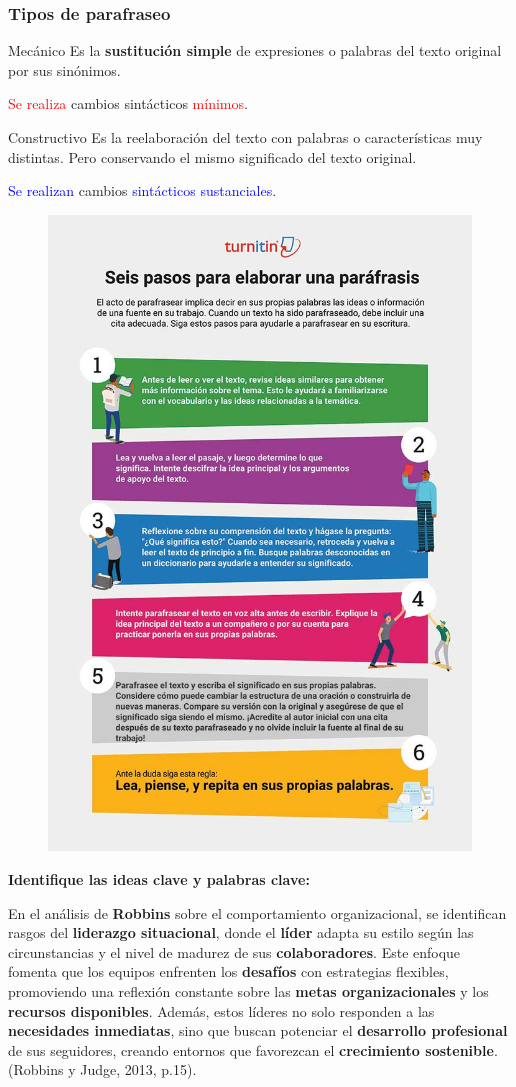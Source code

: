 \documentclass[
11pt, %
]{beamer}
\begin{document}
\begin{frame}
	\frametitle{Tipos de parafraseo}
	\begin{block}{Mecánico}
		Es la \textbf{sustitución simple} de expresiones o palabras del texto original por sus sinónimos.

		\textcolor{red}{Se realiza} cambios sintácticos \textcolor{red}{mínimos}.
	\end{block}

	\begin{block}{Constructivo}
		Es la reelaboración del texto con palabras o características muy distintas. Pero conservando el mismo significado del texto original.

		\textcolor{blue}{Se realizan} cambios \textcolor{blue}{sintácticos} \textcolor{blue}{sustanciales}.
	\end{block}
\end{frame}

\begin{frame}
	\begin{figure}[H]
		\centering
		\includegraphics[width=0.5\linewidth]{images/seis-pasos-para-elaborar-una-parafrasis-opt}
	\end{figure}
\end{frame}

\begin{frame}
	\textbf{Identifique las ideas clave y palabras clave:}
	\begin{block}{} %
		En el análisis de \textbf{Robbins} sobre el comportamiento organizacional, se identifican rasgos del \textbf{liderazgo situacional}, donde el \textbf{líder} adapta su estilo según las circunstancias y el nivel de madurez de sus \textbf{colaboradores}. Este enfoque fomenta que los equipos enfrenten los \textbf{desafíos} con estrategias flexibles, promoviendo una reflexión constante sobre las \textbf{metas organizacionales} y los \textbf{recursos disponibles}. Además, estos líderes no solo responden a las \textbf{necesidades inmediatas}, sino que buscan potenciar el \textbf{desarrollo profesional} de sus seguidores, creando entornos que favorezcan el \textbf{crecimiento sostenible}. (Robbins y Judge, 2013, p.15).
	\end{block}
\end{frame}
\end{document}
